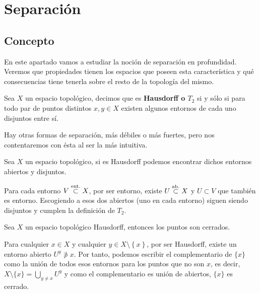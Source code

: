 \chapter{Separación}%
\label{cha:separacion}

\section{Concepto}%
\label{sec:concepto}
En este apartado vamos a estudiar la noción de separación en profundidad. Veremos que propiedades tienen los espacios que poseen esta característica y qué consecuencias tiene tenerla sobre el resto de la topología del mismo.

\begin{defi}
Sea $X$ un espacio topológico, decimos que es \textbf{Hausdorff o $T_2$} si y sólo si para todo par de puntos distintos $x, y \in X$ existen algunos entornos de cada uno disjuntos entre sí.
\end{defi}

Hay otras formas de separación, más débiles o más fuertes, pero nos contentaremos con ésta al ser la más intuitiva.

\begin{prop}
Sea $X$ un espacio topológico, si es Hausdorff podemos encontrar dichos entornos abiertos y disjuntos.
\end{prop}
\begin{demo}
Para cada entorno $V \stackrel{\text{ent.}}{\subset} X$, por ser entorno, existe $U\stackrel{\text{ab.}}{\subset} X$ y $U\subset V$ que también es entorno. Escogiendo a esos dos abiertos (uno en cada entorno) siguen siendo disjuntos y cumplen la definición de $T_2$.
\end{demo}

\begin{prop}
Sea $X$ un espacio topológico Hausdorff, entonces los puntos son cerrados.
\end{prop}
\begin{demo}    
Para cualquier $x \in X$ y cualquier $y \in X \setminus \left\{ x \right\}$, por ser Hausdorff, existe un entorno abierto $U^y \not\ni x$. Por tanto, podemos escribir el complementario de $\{x\}$ como la unión de todos esos entornos para los puntos que no son $x$, es decir, $X \setminus \{x\} = \bigcup_{y \neq x} U^y$ y como el complementario es unión de abiertos, $\{x\}$ es cerrado.
\end{demo}


